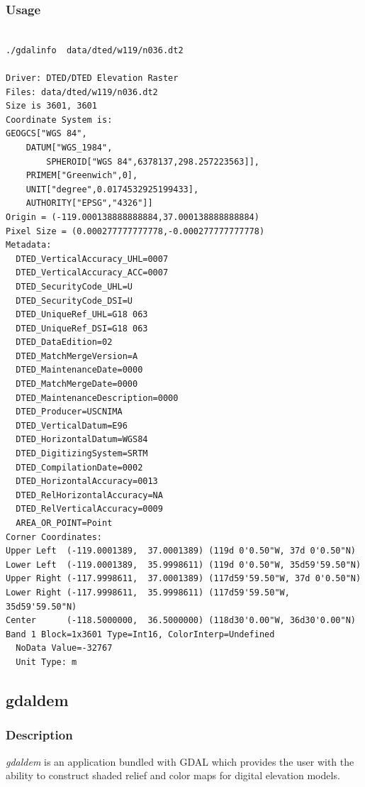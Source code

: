 \subsubsection*{Usage}
\begin{verbatim}

./gdalinfo  data/dted/w119/n036.dt2

Driver: DTED/DTED Elevation Raster
Files: data/dted/w119/n036.dt2
Size is 3601, 3601
Coordinate System is:
GEOGCS["WGS 84",
    DATUM["WGS_1984",
        SPHEROID["WGS 84",6378137,298.257223563]],
    PRIMEM["Greenwich",0],
    UNIT["degree",0.0174532925199433],
    AUTHORITY["EPSG","4326"]]
Origin = (-119.000138888888884,37.000138888888884)
Pixel Size = (0.000277777777778,-0.000277777777778)
Metadata:
  DTED_VerticalAccuracy_UHL=0007
  DTED_VerticalAccuracy_ACC=0007
  DTED_SecurityCode_UHL=U  
  DTED_SecurityCode_DSI=U
  DTED_UniqueRef_UHL=G18 063     
  DTED_UniqueRef_DSI=G18 063        
  DTED_DataEdition=02
  DTED_MatchMergeVersion=A
  DTED_MaintenanceDate=0000
  DTED_MatchMergeDate=0000
  DTED_MaintenanceDescription=0000
  DTED_Producer=USCNIMA 
  DTED_VerticalDatum=E96
  DTED_HorizontalDatum=WGS84
  DTED_DigitizingSystem=SRTM      
  DTED_CompilationDate=0002
  DTED_HorizontalAccuracy=0013
  DTED_RelHorizontalAccuracy=NA  
  DTED_RelVerticalAccuracy=0009
  AREA_OR_POINT=Point
Corner Coordinates:
Upper Left  (-119.0001389,  37.0001389) (119d 0'0.50"W, 37d 0'0.50"N)
Lower Left  (-119.0001389,  35.9998611) (119d 0'0.50"W, 35d59'59.50"N)
Upper Right (-117.9998611,  37.0001389) (117d59'59.50"W, 37d 0'0.50"N)
Lower Right (-117.9998611,  35.9998611) (117d59'59.50"W, 35d59'59.50"N)
Center      (-118.5000000,  36.5000000) (118d30'0.00"W, 36d30'0.00"N)
Band 1 Block=1x3601 Type=Int16, ColorInterp=Undefined
  NoData Value=-32767
  Unit Type: m

\end{verbatim}

\clearpage
{}
\subsection*{gdaldem}

\subsubsection*{Description}
\emph{gdaldem} is an application bundled with GDAL which provides the user with the ability to 
construct shaded relief and color maps for digital elevation models.   

